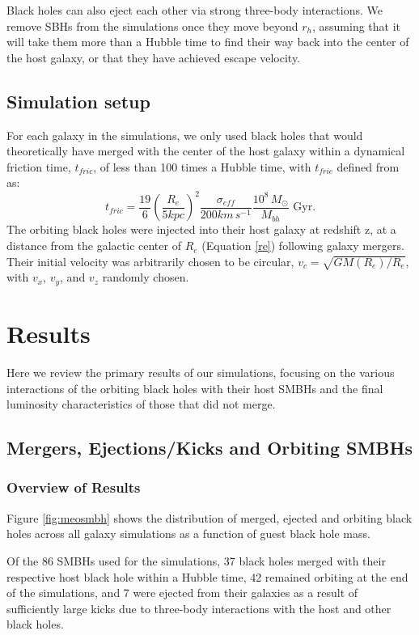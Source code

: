\documentclass[english, apj]{emulateapj}
\begin{document}
Black holes can also eject each other via strong three-body interactions. We remove SBHs from the simulations once they move beyond $r_h$, assuming that it will take them more than a Hubble time to find their way back into the center of the host galaxy, or that they have achieved escape velocity.

\subsection{Simulation setup}
For each galaxy in the simulations, we only used black holes that would theoretically have merged with the center of the host galaxy within a dynamical friction time, $t_{fric}$, of less than 100 times a Hubble time, with $t_{fric}$ defined from \citet{2008gady.book.....B} as:
\begin{equation}\label{tfric}
    t_{fric} = \frac{19}{6}\left(\frac{R_e}{5kpc}\right)^2\frac{\sigma_{eff}}{200km\,s^{-1}}\frac{10^8\,M_{\odot}}{M_{bh}} \text{  Gyr}.
\end{equation}
The orbiting black holes were injected into their host galaxy at redshift z, at a distance from the galactic center of $R_{e}$ (Equation \ref{re}) following galaxy mergers.  Their initial velocity was arbitrarily chosen to be circular, $v_c = \sqrt{GM(R_e)/R_e}$, with $v_x$, $v_y$, and $v_z$ randomly chosen.

\section{Results}\label{sec:results}
Here we review the primary results of our simulations, focusing on the various interactions of the orbiting black holes with their host SMBHs and the final luminosity characteristics of those that did not merge.

\subsection{Mergers, Ejections/Kicks and Orbiting SMBHs}

\subsubsection{Overview of Results}\label{sec:results_overview}
Figure \ref{fig:meosmbh} shows the distribution of merged, ejected and orbiting black holes across all galaxy simulations as a function of guest black hole mass.

Of the 86 SMBHs used for the simulations, 37 black holes merged with their respective host black hole within a Hubble time, 42 remained orbiting at the end of the simulations, and 7 were ejected from their galaxies as a result of sufficiently large kicks due to three-body interactions with the host and other black holes.
\end{document}
